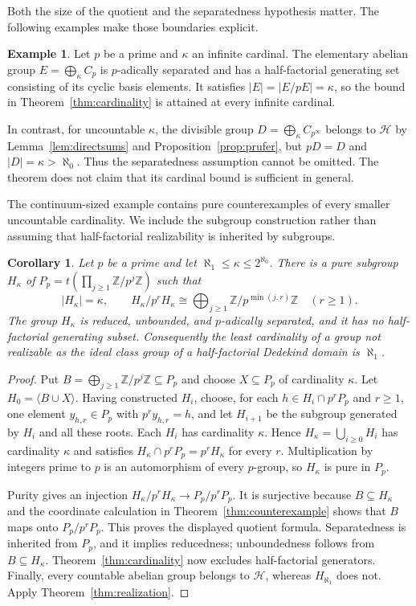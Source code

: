 \documentclass[11pt,reqno]{amsart}
\numberwithin{equation}{section}
\newtheorem{corollary}[theorem]{Corollary}
\theoremstyle{definition}
\newtheorem{example}[theorem]{Example}
\theoremstyle{remark}
\newcommand{\Z}{\mathbb Z}
\newcommand{\HF}{\mathcal H}
\begin{document}
Both the size of the quotient and the separatedness hypothesis matter.
The following examples make those boundaries explicit.

\begin{example}\label{ex:cardinality-boundaries}
Let $p$ be a prime and $\kappa$ an infinite cardinal. The elementary
abelian group $E=\bigoplus_{\kappa}C_p$ is $p$-adically separated
and has a half-factorial generating set consisting of its cyclic
basis elements. It satisfies $|E|=|E/pE|=\kappa$, so the bound in
Theorem~\ref{thm:cardinality} is attained at every infinite cardinal.

In contrast, for uncountable $\kappa$, the divisible group
$D=\bigoplus_{\kappa}C_{p^\infty}$ belongs to $\HF$ by
Lemma~\ref{lem:directsums} and Proposition~\ref{prop:prufer}, but
$pD=D$ and $|D|=\kappa>\aleph_0$. Thus the separatedness assumption
cannot be omitted. The theorem does not claim that its cardinal
bound is sufficient in general.
\end{example}

The continuum-sized example contains pure counterexamples of every
smaller uncountable cardinality. We include the subgroup construction
rather than assuming that half-factorial realizability is inherited
by subgroups.

\begin{corollary}\label{cor:aleph-one}
Let $p$ be a prime and let $\aleph_1\le\kappa\le2^{\aleph_0}$.
There is a pure subgroup $H_\kappa$ of
$P_p=t(\prod_{j\ge1}\Z/p^j\Z)$ such that
\[
 |H_\kappa|=\kappa,\qquad
 H_\kappa/p^rH_\kappa\cong
 \bigoplus_{j\ge1}\Z/p^{\min(j,r)}\Z\quad(r\ge1).
\]
The group $H_\kappa$ is reduced, unbounded, and $p$-adically
separated, and it has no half-factorial generating subset.
Consequently the least cardinality of a group not realizable as
the ideal class group of a half-factorial Dedekind domain is
$\aleph_1$.
\end{corollary}

\begin{proof}
Put $B=\bigoplus_{j\ge1}\Z/p^j\Z\subseteq P_p$ and choose
$X\subseteq P_p$ of cardinality $\kappa$. Let
$H_0=\langle B\cup X\rangle$. Having constructed $H_i$, choose,
for each $h\in H_i\cap p^rP_p$ and $r\ge1$, one element
$y_{h,r}\in P_p$ with $p^ry_{h,r}=h$, and let $H_{i+1}$ be the
subgroup generated by $H_i$ and all these roots. Each $H_i$ has
cardinality $\kappa$. Hence $H_\kappa=\bigcup_{i\ge0}H_i$ has
cardinality $\kappa$ and satisfies
$H_\kappa\cap p^rP_p=p^rH_\kappa$ for every $r$. Multiplication
by integers prime to $p$ is an automorphism of every $p$-group,
so $H_\kappa$ is pure in $P_p$.

Purity gives an injection
$H_\kappa/p^rH_\kappa\to P_p/p^rP_p$. It is surjective because
$B\subseteq H_\kappa$ and the coordinate calculation in
Theorem~\ref{thm:counterexample} shows that $B$ maps onto
$P_p/p^rP_p$. This proves the displayed quotient formula.
Separatedness is inherited from $P_p$, and it implies reducedness;
unboundedness follows from $B\subseteq H_\kappa$. Theorem~\ref{thm:cardinality}
now excludes half-factorial generators. Finally, every countable
abelian group belongs to $\HF$, whereas $H_{\aleph_1}$ does not.
Apply Theorem~\ref{thm:realization}.
\end{proof}
\end{document}
